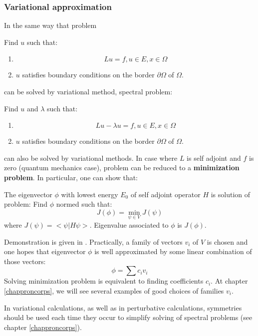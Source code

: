 \documentclass[12pt]{book}
\begin{document}
\subsubsection{Variational approximation}
In the same way that problem
\begin{prob}
Find $u$ such that:
\begin{enumerate}
\item 
\begin{equation}
Lu=f, u\in E, x\in\Omega
\end{equation}
\item $u$ satisfies boundary conditions on the border
$\partial 
\Omega$ of $\Omega$.
\end{enumerate}
\end{prob}
can be solved by variational method, spectral problem:
\begin{prob}
Find $u$ and $\lambda$ such that:
\begin{enumerate}
\item 
\begin{equation}
Lu-\lambda u=f, u\in E, x\in\Omega
\end{equation}
\item $u$ satisfies boundary conditions on the border
$\partial \Omega$ of $\Omega$.
\end{enumerate}
\end{prob}
can also be solved by variational methods. In case where $L$ is self adjoint
and $f$ is zero (quantum mechanics case), problem can be reduced to a
{\bf minimization problem}. In particular, one can show that:
\begin{thm}
The eigenvector $\phi$ with lowest energy $E_0$  of self adjoint operator
$H$ is solution of problem:
Find $\phi$ normed such that:
\begin{equation}
J(\phi)=\min_{\psi\in V}J(\psi)
\end{equation}
where $J(\psi)=<\psi|H\psi>$. Eigenvalue associated to $\phi$
is $J(\phi)$.
\end{thm}
Demonstration is given in \cite{ph:mecaq:Cohen73,ph:mecaq:Pauling60}.
Practically, a family of vectors $v_i$ of $V$ is chosen and one hopes that
eigenvector $\phi$ is well approximated by some linear combination of those vectors:
\begin{equation}
\phi=\sum c_iv_i
\end{equation}
Solving minimization problem is equivalent to finding coefficients
$c_i$. At chapter 
\ref{chapproncorps}, we will see several examples of good choices of families
$v_i$. 
\begin{rem}
In variational calculations, as well as in perturbative calculations,
symmetries should be used each time they occur to simplify solving of
spectral problems (see chapter \ref{chapproncorps}).
\end{rem}
\end{document}
